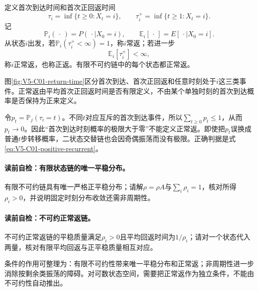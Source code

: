 定义首次到达时间和首次正回返时间
\begin{equation}\label{eq:V5-C01-hitting-times}
\tau_i=\inf\{t\ge0:X_t=i\},
\qquad
\tau_i^+=\inf\{t\ge1:X_t=i\}.
\end{equation}
记
\[
\mathbb P_i(\,\cdot\,)=P(\,\cdot\mid X_0=i),
\qquad
\mathbb E_i[\,\cdot\,]=E[\,\cdot\mid X_0=i].
\]
从状态$i$出发，若$\mathbb P_i(\tau_i^+<\infty)=1$，称$i$常返；若进一步
\begin{equation}\label{eq:V5-C01-positive-recurrent}
\mathbb E_i[\tau_i^+]<\infty,
\end{equation}
称$i$正常返，也称正返。有限不可约链中的每个状态都正常返。

图\ref{fig:V5-C01-return-time}区分首次到达、首次正回返和任意时刻处于$i$这三类事件。正常返由平均首次正回返时间是否有限定义，不由某个单独时刻的首次到达概率是否保持为正来定义。


\begin{warningbox}
令$p_t=\mathbb P_j(\tau_i=t)$。不同$t$对应互斥的首次到达事件，所以$\sum_{t\ge0}p_t\le1$，从而$p_t\to0$。因此“首次到达时刻概率的极限大于零”不能定义正常返。即使把$p_t$误换成普通$t$步转移概率，二状态交替链也会因奇偶振荡而没有极限。正确判据是式\eqref{eq:V5-C01-positive-recurrent}。
\end{warningbox}

\paragraph{读前自检：有限状态链的唯一平稳分布。}有限不可约链具有唯一严格正平稳分布；请解$\rho=\rho A$与$\sum_i\rho_i=1$，核对所得$\rho_i>0$，并说明固定时刻分布收敛还需非周期性。\par
\paragraph{读前自检：不可约正常返链。}不可约正常返链的平稳质量满足$\rho_i>0$且平均回返时间为$1/\rho_i$；请对一个状态代入两量，核对有限平均回返与正平稳质量相互对应。\par

条件的作用可整理为：有限不可约性带来唯一平稳分布和正常返；非周期性进一步消除按剩余类振荡的障碍。对可数状态空间，需要把正常返作为独立条件，不能由不可约性自动推出。

